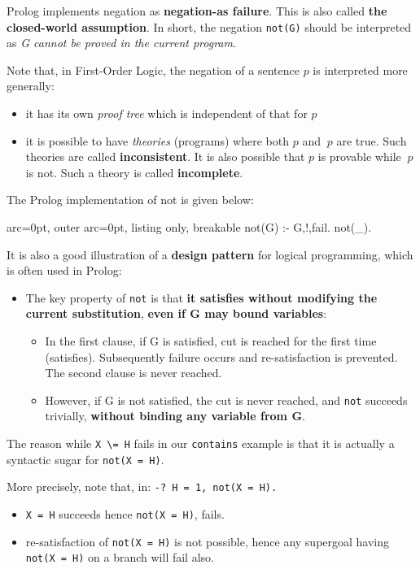 Prolog implements negation as \textbf{negation-as failure}. This is also called \textbf{the closed-world assumption}. In short, the negation \texttt{not(G)} should be interpreted as \textit{G cannot be proved in the current program}. 

Note that, in First-Order Logic, the negation of a sentence $p$ is interpreted more generally:
\begin{itemize}
	\item  it has its own \textit{proof tree} which is independent of that for $p$
	\item  it is possible to have \textit{theories} (programs) where both $p$ and $~p$ are true. Such theories are called \textbf{inconsistent}. It is also possible that $p$ is provable while $~p$ is not. Such a theory is called \textbf{incomplete}.
\end{itemize}

The Prolog implementation of not is given below:

\begin{tcblisting}{ arc=0pt, outer arc=0pt, listing only, breakable}
not(G) :- G,!,fail.
not(_).

\end{tcblisting}


It is also a good illustration of a \textbf{design pattern} for logical programming, which is often used in Prolog:
\begin{itemize}
	\item  The key property of \texttt{not} is that \textbf{it satisfies without modifying the current substitution}, \textbf{even if G may bound variables}: 

  \begin{itemize}
  	\item  In the first clause, if G is satisfied, cut is reached for the first time (satisfies). Subsequently failure occurs and re-satisfaction is prevented. The second clause is never reached. 
  	\item  However, if G is not satisfied, the cut is never reached, and \texttt{not} succeeds trivially, \textbf{without binding any variable from G}. 
  \end{itemize}
\end{itemize}


The reason while \texttt{X \textbackslash = H} fails in our \texttt{contains} example is that it is actually a syntactic sugar for \texttt{not(X = H)}.

More precisely, note that, in: \texttt{-? H = 1, not(X = H).}
\begin{itemize}
	\item  \texttt{X = H} succeeds hence \texttt{not(X = H)}, fails.
	\item  re-satisfaction of \texttt{not(X = H)} is not possible, hence any supergoal having \texttt{not(X = H)} on a branch will fail also.
\end{itemize}
